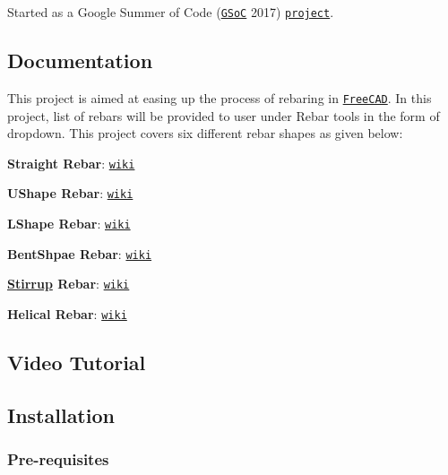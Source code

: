 Started as a Google Summer of Code (\href{https://en.wikipedia.org/wiki/Google_Summer_of_Code}{\tt G\+SoC} 2017) \href{https://summerofcode.withgoogle.com/archive/2017/projects/6536382147198976}{\tt project}.



\subsection*{Documentation}

This project is aimed at easing up the process of rebaring in \href{https://www.freecadweb.org}{\tt Free\+C\+AD}. In this project, list of rebars will be provided to user under Rebar tools in the form of dropdown. This project covers six different rebar shapes as given below\+:


\begin{DoxyItemize}
\item  {\bfseries Straight Rebar}\+: \href{https://www.freecadweb.org/wiki/Arch_Rebar_Straight}{\tt wiki} 
\item  {\bfseries U\+Shape Rebar}\+: \href{https://www.freecadweb.org/wiki/Arch_Rebar_UShape}{\tt wiki} 
\item  {\bfseries L\+Shape Rebar}\+: \href{https://www.freecadweb.org/wiki/Arch_Rebar_LShape}{\tt wiki} 
\item  {\bfseries Bent\+Shpae Rebar}\+: \href{https://www.freecadweb.org/wiki/Arch_Rebar_BentShape}{\tt wiki} 
\item  {\bfseries \hyperlink{namespaceStirrup}{Stirrup} Rebar}\+: \href{https://www.freecadweb.org/wiki/Arch_Rebar_Stirrup}{\tt wiki} 
\item  {\bfseries Helical Rebar}\+: \href{https://www.freecadweb.org/wiki/Arch_Rebar_Helical}{\tt wiki} 
\end{DoxyItemize}

\subsection*{Video Tutorial}

\href{https://www.youtube.com/watch?v=BYQQjEKmx5E&t=1435s}{\tt }

\subsection*{Installation}

\subsubsection*{Pre-\/requisites}


